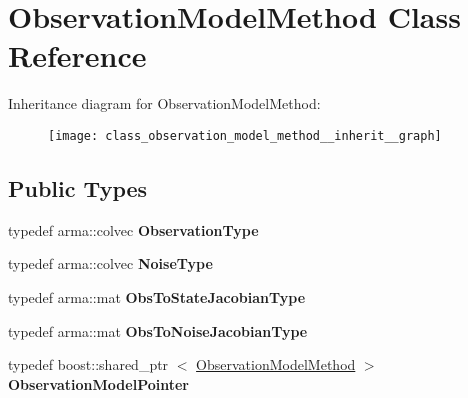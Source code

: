 \hypertarget{class_observation_model_method}{\section{\-Observation\-Model\-Method \-Class \-Reference}
\label{class_observation_model_method}
}


\-Inheritance diagram for \-Observation\-Model\-Method\-:
\nopagebreak
\begin{figure}[H]
\begin{center}
\leavevmode
\texttt{[image: class\_observation\_model\_method\_\_inherit\_\_graph]}
\end{center}
\end{figure}
\subsection*{\-Public \-Types}
\begin{DoxyCompactItemize}
\item 
\hypertarget{class_observation_model_method_af5a5953c0f7b82691d36f353ed08aa03}{typedef arma\-::colvec {\bfseries \-Observation\-Type}}\label{class_observation_model_method_af5a5953c0f7b82691d36f353ed08aa03}

\item 
\hypertarget{class_observation_model_method_a380b1d02a13fa85f2a4d8610b648d446}{typedef arma\-::colvec {\bfseries \-Noise\-Type}}\label{class_observation_model_method_a380b1d02a13fa85f2a4d8610b648d446}

\item 
\hypertarget{class_observation_model_method_a1c83d0c9794c0316818c0ee87fba4a24}{typedef arma\-::mat {\bfseries \-Obs\-To\-State\-Jacobian\-Type}}\label{class_observation_model_method_a1c83d0c9794c0316818c0ee87fba4a24}

\item 
\hypertarget{class_observation_model_method_ac1a379fcac7d5d5d67391362eb91c252}{typedef arma\-::mat {\bfseries \-Obs\-To\-Noise\-Jacobian\-Type}}\label{class_observation_model_method_ac1a379fcac7d5d5d67391362eb91c252}

\item 
\hypertarget{class_observation_model_method_ad119ee691daccc6a1410de7a18a93b7f}{typedef boost\-::shared\-\_\-ptr\*
$<$ \hyperlink{class_observation_model_method}{\-Observation\-Model\-Method} $>$ {\bfseries \-Observation\-Model\-Pointer}}\label{class_observation_model_method_ad119ee691daccc6a1410de7a18a93b7f}

\end{DoxyCompactItemize}
